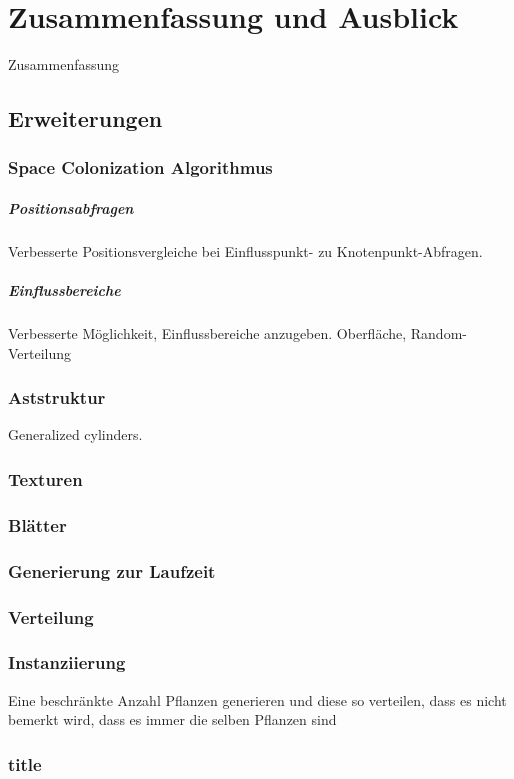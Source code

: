 \chapter{Zusammenfassung und Ausblick}

Zusammenfassung

\section{Erweiterungen}

\subsection{Space Colonization Algorithmus}

\paragraph{Positionsabfragen}
Verbesserte Positionsvergleiche bei Einflusspunkt- zu Knotenpunkt-Abfragen.

\paragraph{Einflussbereiche} 
Verbesserte Möglichkeit, Einflussbereiche anzugeben. Oberfläche, Random-Verteilung

\subsection{Aststruktur}

Generalized cylinders.

\subsection{Texturen}

\subsection{Blätter}

\subsection{Generierung zur Laufzeit}

\subsection{Verteilung}

\subsection{Instanziierung}
Eine beschränkte Anzahl Pflanzen generieren und diese so verteilen, dass es nicht bemerkt wird, dass es immer die selben Pflanzen sind

\subsection{title}